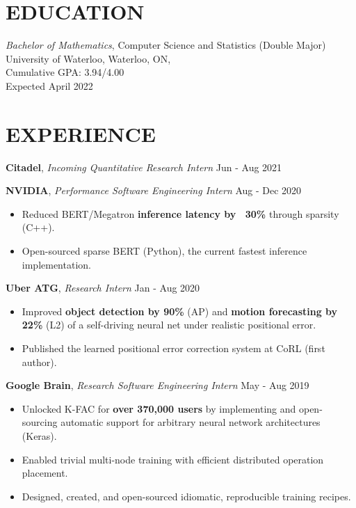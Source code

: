 \documentclass[line,margin]{res}
\newcommand{\experience}[3]{\textbf{#1}, \textit{#2} \hfill #3 \\ \vspace{-4mm}}
\begin{document}
\address{
    (647) 643-4450 $\cdot$
    \href{mailto:nbvadive@uwaterloo.ca}{nbvadive@uwaterloo.ca} $\cdot$
    \href{https://nicholasvadivelu.com/}{nicholasvadivelu.com}
}

\begin{resume}
\vspace{-4mm}

\section{EDUCATION}
    \textit{Bachelor of Mathematics}, Computer Science and Statistics (Double Major) \\
    University of Waterloo, Waterloo, ON, \\
    Cumulative GPA: 3.94/4.00 \\
    Expected April 2022


\section{EXPERIENCE}
    \experience{Citadel}{Incoming Quantitative Research Intern}{Jun - Aug 2021}
    \vspace{-2mm}

    \experience{NVIDIA}{Performance Software Engineering Intern}{Aug - Dec 2020}
    \begin{itemize}
        \item Reduced BERT/Megatron \textbf{inference latency by ~30\%} through sparsity (C++).
        \item Open-sourced sparse BERT (Python), the current fastest inference implementation.
    \end{itemize}

    \experience{Uber ATG}{Research Intern}{Jan - Aug 2020}
    \begin{itemize}
        \item Improved \textbf{object detection by 90\%} (AP) and \textbf{motion forecasting by 22\%} (L2) of a self-driving neural net under realistic positional error.
        \item Published the learned positional error correction system at CoRL (first author).
    \end{itemize}

    \experience{Google Brain}{Research Software Engineering Intern}{May - Aug 2019}
    \begin{itemize}
        \item Unlocked K-FAC for \textbf{over 370,000 users} by implementing and open-sourcing automatic support for arbitrary neural network architectures (Keras).
        \item Enabled trivial multi-node training with efficient distributed operation placement.
        \item Designed, created, and open-sourced idiomatic, reproducible training recipes.
    \end{itemize}


\end{resume}
\end{document}
